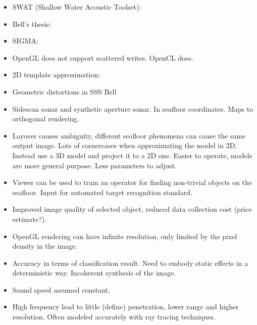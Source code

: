 \begin{itemize}
\item SWAT (Shallow Water Acoustic Toolset): 
\item Bell's thesis:
\item SIGMA:
\item OpenGL does not support scattered writes. OpenCL does.
\item 2D template approximation:
\item Geometric distortions in SSS \cite{Cobra1992} Bell
\item Sidescan sonar and synthetic aperture sonar. In seafloor coordinates. Maps to orthogonal rendering.
\item Layover causes ambiguity, different seafloor phenomena can cause the same output image. Lots of cornercases when approximating the model in 2D. Instead use a 3D model and project it to a 2D one. Easier to operate, models are more general purpose. Less parameters to adjust.
\item Viewer can be used to train an operator for finding non-trivial objects on the seafloor. Input for automated target recognition standard.
\item Improved image quality of selected object, reduced data collection cost (price estimate?).
\item OpenGL rendering can have infinite resolution, only limited by the pixel density in the image.
\item Accuracy in terms of classification result. Need to embody static effects in a deterministic way. Incoherent synthesis of the image.
\item Sound speed assumed constant.
\item High frequency lead to little (define) penetration, lower range and higher resolution. Often modeled accurately with ray tracing techniques.
\end{itemize}

